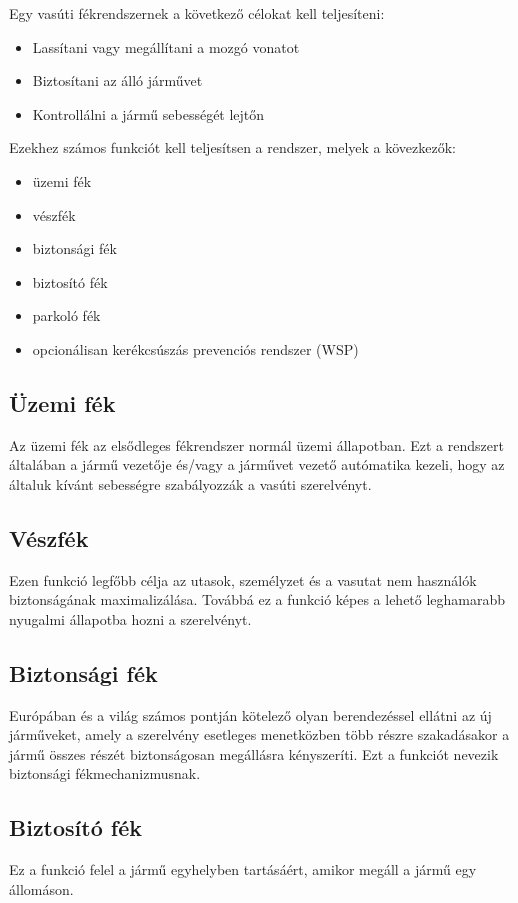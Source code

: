 Egy vasúti fékrendszernek a következő célokat kell teljesíteni:
\begin{itemize}
    \item Lassítani vagy megállítani a mozgó vonatot
    \item Biztosítani az álló járművet
    \item Kontrollálni a jármű sebességét lejtőn
\end{itemize}

Ezekhez számos funkciót kell teljesítsen a rendszer, melyek a kövezkezők:
\begin{itemize}
    \item üzemi fék
    \item vészfék
    \item biztonsági fék
    \item biztosító fék
    \item parkoló fék
    \item opcionálisan kerékcsúszás prevenciós rendszer (WSP\footnotemark{})
\end{itemize}

\subsection{Üzemi fék}
Az üzemi fék az elsődleges fékrendszer normál üzemi állapotban.
Ezt a rendszert általában a jármű vezetője és/vagy a járművet vezető autómatika kezeli, hogy az általuk kívánt sebességre szabályozzák a vasúti szerelvényt.

\subsection{Vészfék}
Ezen funkció legfőbb célja az utasok, személyzet és a vasutat nem használók biztonságának maximalizálása.
Továbbá ez a funkció képes a lehető leghamarabb nyugalmi állapotba hozni a szerelvényt.

\subsection{Biztonsági fék}
Európában és a világ számos pontján kötelező olyan berendezéssel ellátni az új járműveket, amely a szerelvény esetleges menetközben több részre szakadásakor
a jármű összes részét biztonságosan megállásra kényszeríti. Ezt a funkciót nevezik biztonsági fékmechanizmusnak.

\subsection{Biztosító fék}
Ez a funkció felel a jármű egyhelyben tartásáért, amikor megáll a jármű egy állomáson.

